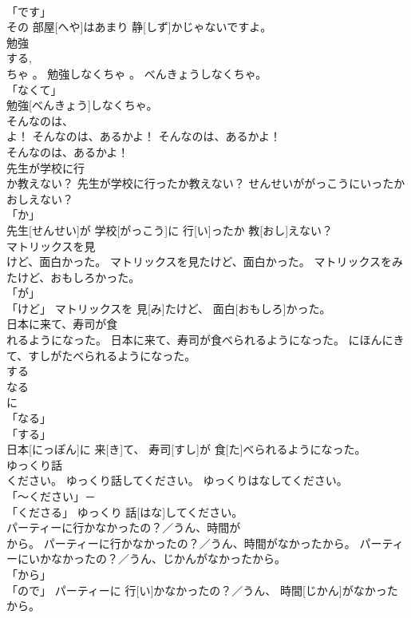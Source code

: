 \documentclass[8pt]{extreport}
\begin{document}
\begin{CJK}{UTF8}{min}
\\	「です」 
\\	その 部屋[へや]はあまり 静[しず]かじゃないですよ。		
\\	勉強
\\	する, 
\\	ちゃ 。	勉強しなくちゃ 。	べんきょうしなくちゃ。	
\\	「なくて」
\\	勉強[べんきょう]しなくちゃ。		
\\	そんなのは、
\\	よ！	そんなのは、あるかよ！	そんなのは、あるかよ！	
\\	そんなのは、あるかよ！		
\\	先生が学校に行
\\	か教えない？	先生が学校に行ったか教えない？	せんせいががっこうにいったかおしえない？	
\\	「か」 
\\	先生[せんせい]が 学校[がっこう]に 行[い]ったか 教[おし]えない？		
\\	マトリックスを見
\\	けど、面白かった。	マトリックスを見たけど、面白かった。	マトリックスをみたけど、おもしろかった。	
\\	「が」 
\\	「けど」	マトリックスを 見[み]たけど、 面白[おもしろ]かった。		
\\	日本に来て、寿司が食
\\	れるようになった。	日本に来て、寿司が食べられるようになった。	にほんにきて、すしがたべられるようになった。	
\\	する 
\\	なる 
\\	に 
\\	「なる」 
\\	「する」 
\\	日本[にっぽん]に 来[き]て、 寿司[すし]が 食[た]べられるようになった。		
\\	ゆっくり話
\\	ください。	ゆっくり話してください。	ゆっくりはなしてください。	
\\	「～ください」－ 
\\	「くださる」	ゆっくり 話[はな]してください。		
\\	パーティーに行かなかったの？／うん、時間が
\\	から。	パーティーに行かなかったの？／うん、時間がなかったから。	パーティーにいかなかったの？／うん、じかんがなかったから。	
\\	「から」 
\\	「ので」	パーティーに 行[い]かなかったの？／うん、 時間[じかん]がなかったから。		

\end{CJK}
\end{document}
